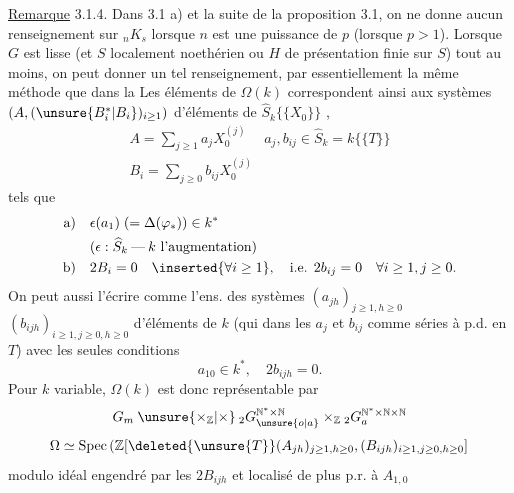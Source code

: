 \uline{Remarque} 3.1.4. Dans 3.1 a) et la suite de la proposition 3.1, on ne
donne aucun renseignement sur ${}_nK_s$ lorsque $n$ est une puissance de $p$
(lorsque $p>1$). Lorsque $G$ est lisse (et $S$ localement noethérien ou
$H$ de présentation finie sur $S$) tout au moins, on peut donner un tel
renseignement, par essentiellement la même méthode que dans la
Les  éléments de $\Omega(k)$ correspondent
ainsi aux systèmes $(A,(\unsure{B_i^*|B_i})_{i\geq1})$ d'éléments
de $\widehat S_k\{\{X_0\}\}$ ,
\[
 \begin{array}{l|l}
 A=\displaystyle\sum_{j\geq1}a_jX_0^{(j)}&a_j,b_{ij}\in\widehat S_k=k\{\{T\}\}\\
 B_i=\displaystyle\sum_{j\geq0}b_{ij}X_0^{(j)}&
 \end{array}
\]
tels que
\[
 \begin{aligned}
 \text{a)}\quad&\epsilon(a_1)\;(=\Delta(\varphi_*))\in k^*\\
 &(\epsilon:\widehat S_k\mathbin{\text{---}}k\text{ l'augmentation})\\
 \text{b)}\quad&2B_i=0\quad\inserted{\forall i\geq1},\quad\text{i.e. }2b_{ij}=0
 \quad\forall i\geq1,j\geq0.
 \end{aligned}
\]
On peut aussi l'écrire comme l'ens. des systèmes
$(a_{jh})_{j\geq1,h\geq0}$ $(b_{ijh})_{i\geq1,j\geq0,h\geq0}$
d'éléments de $k$ (qui  dans les
$a_j$ et $b_{ij}$ comme séries à p.d. en $T$) avec les seules conditions
\[
 a_{10}\in k^*,\quad 2b_{ijh}=0.
\]
Pour $k$ variable,  $\Omega(k)$ est donc
représentable par 
\[
 G_m\mathbin{\unsure{\times_{\mathbb Z}|\times}}
 {}_2G_{\unsure{o|a}}^{\mathbb N^*\times\mathbb N}\times_{\mathbb Z}{}_2G_a^{\mathbb N^*\times\mathbb N\times\mathbb N}
\]
\[
 \Omega\simeq\operatorname{Spec}\left(
 \mathbb Z[\deleted{\unsure{T}}(A_{jh})_{j\geq1,h\geq0},
 (B_{ijh})_{i\geq1,j\geq0,h\geq0}]
 \right.
\]
modulo idéal engendré par les $2B_{ijh}$ et localisé de plus p.r. à $A_{1,0}$

